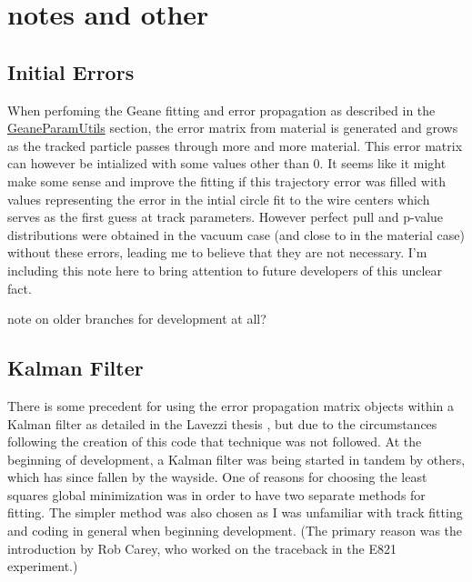\section{notes and other}

  \subsection{Initial Errors}

  When perfoming the Geane fitting and error propagation as described in the \hyperref[sec:GeaneParamUtils]{GeaneParamUtils} section, the error matrix from material is generated and grows as the tracked particle passes through more and more material. This error matrix can however be intialized with some values other than 0. It seems like it might make some sense and improve the fitting if this trajectory error was filled with values representing the error in the intial circle fit to the wire centers which serves as the first guess at track parameters. However perfect pull and p-value distributions were obtained in the vacuum case (and close to in the material case) without these errors, leading me to believe that they are not necessary. I'm including this note here to bring attention to future developers of this unclear fact.



  note on older branches for development at all?



  \subsection{Kalman Filter}

    There is some precedent for using the error propagation matrix objects within a Kalman filter as detailed in the Lavezzi thesis \cite{Lavezzi}, but due to the circumstances following the creation of this code that technique was not followed. At the beginning of development, a Kalman filter was being started in tandem by others, which has since fallen by the wayside. One of reasons for choosing the least squares global minimization was in order to have two separate methods for fitting. The simpler method was also chosen as I was unfamiliar with track fitting and coding in general when beginning development. (The primary reason was the introduction by Rob Carey, who worked on the traceback in the E821 experiment.)
